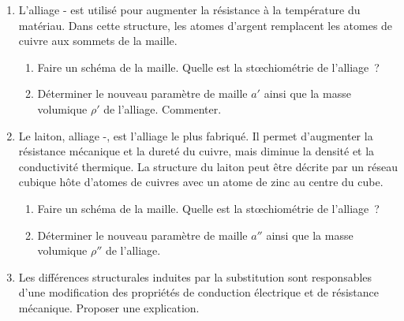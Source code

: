 \documentclass[a4paper, 10pt, final, garamond]{book}
\begin{document}
\begin{enumerate}[resume]
  \item L'alliage - est utilisé pour augmenter la résistance à la
    température du matériau. Dans cette structure, les atomes d'argent
    remplacent les atomes de cuivre aux sommets de la maille.
    \begin{enumerate}
      \item Faire un schéma de la maille. Quelle est la stœchiométrie de
        l'alliage~?
      \item Déterminer le nouveau paramètre de maille $a'$ ainsi que la masse
        volumique $\rho'$ de l'alliage. Commenter.
    \end{enumerate}
  \item Le laiton, alliage -, est l'alliage le plus fabriqué. Il
    permet d'augmenter la résistance mécanique et la dureté du cuivre, mais
    diminue la densité et la conductivité thermique. La structure du laiton peut
    être décrite par un réseau cubique hôte d'atomes de cuivres avec un atome de
    zinc au centre du cube.
    \begin{enumerate}
      \item Faire un schéma de la maille. Quelle est la stœchiométrie de
        l'alliage~?
      \item Déterminer le nouveau paramètre de maille $a''$ ainsi que la masse
        volumique $\rho''$ de l'alliage.
    \end{enumerate}
  \item Les différences structurales induites par la substitution sont
    responsables d'une modification des propriétés de conduction électrique et
    de résistance mécanique. Proposer une explication.
\end{enumerate}
\end{document}
